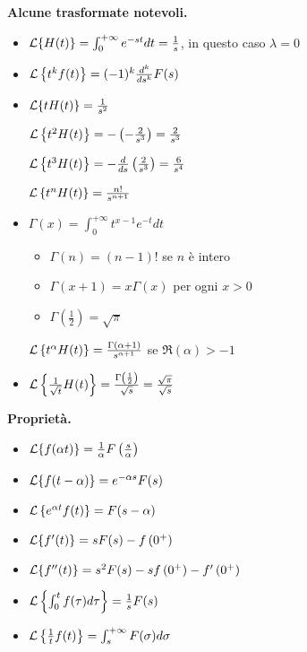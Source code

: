 \textbf{Alcune trasformate notevoli.}
\begin{itemize}
\item $\mathcal{L}\{H(t)\} = \int^{+ \infty}_{0} e^{- st} dt = \frac{1}{s}$, in questo caso $\lambda = 0$
\item $\mathcal{L}\left\{t^{k} f(t)\right\} = (- 1)^{k}\frac{d^{k}}{ds^{k}} F(s)$
\item $\mathcal{L}\{tH(t)\} = \frac{1}{s^{2}}$

$\mathcal{L}\left\{t^{2} H(t)\right\} = - \left(- \frac{2}{s^{3}}\right) = \frac{2}{s^{3}}$

$\mathcal{L}\left\{t^{3} H(t)\right\} = - \frac{d}{ds}\left(\frac{2}{s^{3}}\right) = \frac{6}{s^{4}}$

$\mathcal{L}\left\{t^{n} H(t)\right\} = \frac{n!}{s^{n + 1}}$
\item $\Gamma (x) = \int^{+ \infty}_{0} t^{x - 1} e^{- t} dt$
\begin{itemize}
\item $\Gamma (n) = (n - 1) !$ se $n$ è intero
\item $\Gamma (x + 1) = x\Gamma (x)$ per ogni $x > 0$
\item $\Gamma \left(\frac{1}{2}\right) = \sqrt{\pi}$
\end{itemize}

$\mathcal{L}\left\{t^{\alpha} H(t)\right\} = \frac{\Gamma (\alpha + 1)}{s^{\alpha + 1}}$ se $\Re (\alpha)  > - 1$
\item $\mathcal{L}\left\{\frac{1}{\sqrt{t}} H(t)\right\} = \frac{\Gamma \left(\frac{1}{2}\right)}{\sqrt{s}} = \frac{\sqrt{\pi}}{\sqrt{s}}$
\end{itemize}

\textbf{Proprietà.}
\begin{itemize}
\item $\mathcal{L}\{f(\alpha t)\} = \frac{1}{\alpha} F\left(\frac{s}{\alpha}\right)$
\item $\mathcal{L}\{f(t - \alpha)\} = e^{- \alpha s} F(s)$
\item $\mathcal{L}\left\{e^{\alpha t} f(t)\right\} = F(s - \alpha)$
\item $\mathcal{L}\{f'(t)\} = sF(s) - f\left(0^{+}\right)$
\item $\mathcal{L}\{f''(t)\} = s^{2} F(s) - sf\left(0^{+}\right) - f'\left(0^{+}\right)$
\item $\mathcal{L}\left\{\int^{t}_{0} f(\tau) d\tau \right\} = \frac{1}{s} F(s)$
\item $\mathcal{L}\left\{\frac{1}{t} f(t)\right\} = \int^{+ \infty}_{s} F(\sigma) d\sigma $
\end{itemize}

